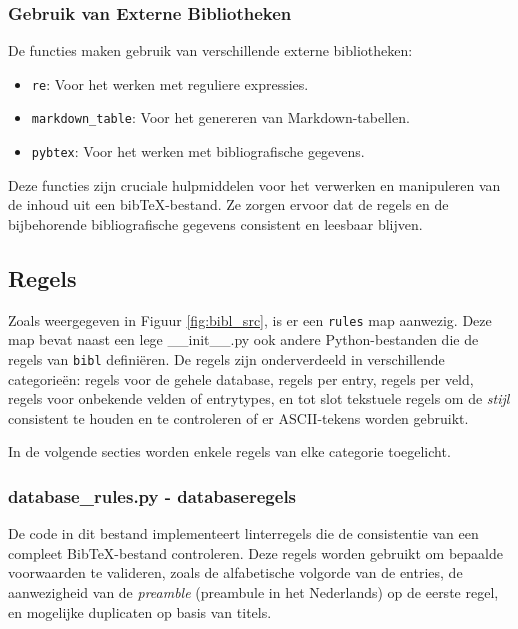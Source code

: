 \subsubsection{Gebruik van Externe Bibliotheken}

De functies maken gebruik van verschillende externe bibliotheken:
\begin{itemize}
    \item \texttt{re}: Voor het werken met reguliere expressies.
    \item \texttt{markdown\_table}: Voor het genereren van Markdown-tabellen.
    \item \texttt{pybtex}: Voor het werken met bibliografische gegevens.
\end{itemize}

Deze functies zijn cruciale hulpmiddelen voor het verwerken en manipuleren van de inhoud uit een bibTeX-bestand. Ze zorgen ervoor dat de regels en de bijbehorende bibliografische gegevens consistent en leesbaar blijven.


\subsection{Regels}
Zoals weergegeven in Figuur \ref{fig:bibl_src}, is er een \texttt{rules} map aanwezig. Deze map bevat naast een lege \_\_init\_\_.py ook andere Python-bestanden die de regels van \texttt{bibl} definiëren. De regels zijn onderverdeeld in verschillende categorieën: regels voor de gehele database, regels per entry, regels per veld, regels voor onbekende velden of entrytypes, en tot slot tekstuele regels om de \emph{stijl} consistent te houden en te controleren of er ASCII-tekens worden gebruikt.

In de volgende secties worden enkele regels van elke categorie toegelicht.


\subsubsection{database\_rules.py - databaseregels}

De code in dit bestand implementeert linterregels die de consistentie van een compleet BibTeX-bestand controleren. Deze regels worden gebruikt om bepaalde voorwaarden te valideren, zoals de alfabetische volgorde van de entries, de aanwezigheid van de \emph{preamble} (preambule in het Nederlands) op de eerste regel, en mogelijke duplicaten op basis van titels.

